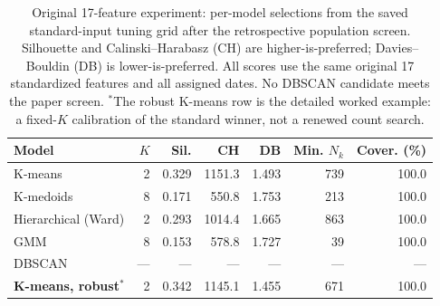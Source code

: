 \begin{table}[htbp]
\centering
\small
\begin{tabularx}{\textwidth}{@{}Xrrrrrr@{}}
\toprule
Model & $K$ & Sil. & CH & DB & Min. $N_k$ & Cover. (\%)\\
\midrule
K-means & 2 & 0.329 & 1151.3 & 1.493 & 739 & 100.0\\
K-medoids & 8 & 0.171 & 550.8 & 1.753 & 213 & 100.0\\
Hierarchical (Ward) & 2 & 0.293 & 1014.4 & 1.665 & 863 & 100.0\\
GMM & 8 & 0.153 & 578.8 & 1.727 & 39 & 100.0\\
DBSCAN & --- & --- & --- & --- & --- & ---\\
\midrule
\textbf{K-means, robust}$^{*}$ & 2 & 0.342 & 1145.1 & 1.455 & 671 & 100.0\\
\bottomrule
\end{tabularx}
\caption{Original 17-feature experiment: per-model selections from the saved standard-input tuning grid after the retrospective population screen. Silhouette and Calinski--Harabasz (CH) are higher-is-preferred; Davies--Bouldin (DB) is lower-is-preferred. All scores use the same original 17 standardized features and all assigned dates. No DBSCAN candidate meets the paper screen. $^{*}$The robust K-means row is the detailed worked example: a fixed-$K$ calibration of the standard winner, not a renewed count search.}
\label{tab:original-selected-models}
\end{table}
